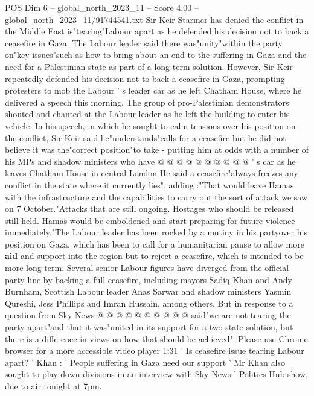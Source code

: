\begin{textsample}{POS Dim 6 – global\_north\_2023\_11 – Score 4.00 – global\_north\_2023\_11/91744541.txt}  \label{ex:f6_pos_220}
Sir Keir Starmer has denied the conflict in the Middle East is"tearing"Labour apart as he defended his decision not to back a ceasefire in Gaza.
The Labour leader said there was"unity"within the party on"key issues"such as how to bring about an end to the suffering in Gaza and the need for a Palestinian state as part of a long-term solution.
However, Sir Keir repeatedly defended his decision not to back a ceasefire in Gaza, prompting protesters to mob the Labour ' s leader car as he left Chatham House, where he delivered a speech this morning.
The group of pro-Palestinian demonstrators shouted and chanted at the Labour leader as he left the building to enter his vehicle.
In his speech, in which he sought to calm tensions over his position on the conflict, Sir Keir said he"understands"calls for a ceasefire but he did not believe it was the"correct position"to take - putting him at odds with a number of his MPs and shadow ministers who have @ @ @ @ @ @ @ @ @ @ ' s car as he leaves Chatham House in central London He said a ceasefire"always freezes any conflict in the state where it currently lies", adding :"That would leave Hamas with the infrastructure and the capabilities to carry out the sort of attack we saw on 7 October."Attacks that are still ongoing.
Hostages who should be released still held.
Hamas would be emboldened and start preparing for future violence immediately."The Labour leader has been rocked by a mutiny in his partyover his position on Gaza, which has been to call for a humanitarian pause to allow more \textbf{aid} and support into the region but to reject a ceasefire, which is intended to be more long-term.
Several senior Labour figures have diverged from the official party line by backing a full ceasefire, including mayors Sadiq Khan and Andy Burnham, Scottish Labour leader Anas Sarwar and shadow ministers Yasmin Qureshi, Jess Phillips and Imran Hussain, among others.
But in response to a question from Sky News @ @ @ @ @ @ @ @ @ @ said"we are not tearing the party apart"and that it was"united in its support for a two-state solution, but there is a difference in views on how that should be achieved".
Please use Chrome browser for a more accessible video player 1:31 ' Is ceasefire issue tearing Labour apart? ' Khan : ' People suffering in Gaza need our support ' Mr Khan also sought to play down divisions in an interview with Sky News ' Politics Hub show, due to air tonight at 7pm.

\end{textsample}
